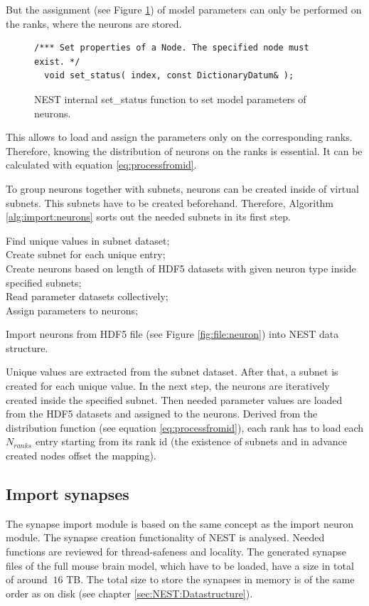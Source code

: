 But the assignment (see Figure \ref{code:setstatus}) of model parameters can only be performed on the ranks,
where the neurons are stored.
\begin{figure}[ht!]
\begin{lstlisting}[style=cppcode]
/*** Set properties of a Node. The specified node must exist. */
  void set_status( index, const DictionaryDatum& );
\end{lstlisting}
\caption{NEST internal set\_{}status function to set model parameters of neurons.}
\label{code:setstatus}
\end{figure}
This allows to load and assign the parameters only on the corresponding ranks.
Therefore, knowing the distribution of neurons on the ranks is essential.
It can be calculated with equation \ref{eq:processfromid}.

To group neurons together with subnets, neurons can be created inside of virtual subnets.
This subnets have to be created beforehand.
Therefore, Algorithm \ref{alg:import:neurons} sorts out the needed subnets in its first step.
\begin{algorithm}[ht!]
 Find unique values in subnet dataset; \\
 Create subnet for each unique entry; \\
 Create neurons based on length of HDF5 datasets with given neuron type inside specified subnets; \\
 Read parameter datasets collectively; \\
 Assign parameters to neurons;\\
 \hspace{0.1cm}
\caption{Import neurons from HDF5 file (see Figure \ref{fig:file:neuron}) into NEST data structure.}
\label{alg:import:neurons}
\end{algorithm}

Unique values are extracted from the subnet dataset.
After that, a subnet is created for each unique value. 
In the next step, the neurons are iteratively created inside the specified subnet.
Then needed parameter values are loaded from the HDF5 datasets and assigned to the neurons.
Derived from the distribution function (see equation \ref{eq:processfromid}), each rank has to load each $N_{ranks}$
entry starting from its rank id (the existence of subnets and in advance created nodes offset the mapping).

\subsection{Import synapses}
The synapse import module is based on the same concept as the import neuron module.
The synapse creation functionality of NEST is analysed.
Needed functions are reviewed for thread-safeness and locality.
The generated synapse files of the full mouse brain model, which have to be loaded, have a size in total of around $~16$ TB.
The total size to store the synapses in memory is of the same order as on disk (see chapter \ref{sec:NEST:Datastructure}).


